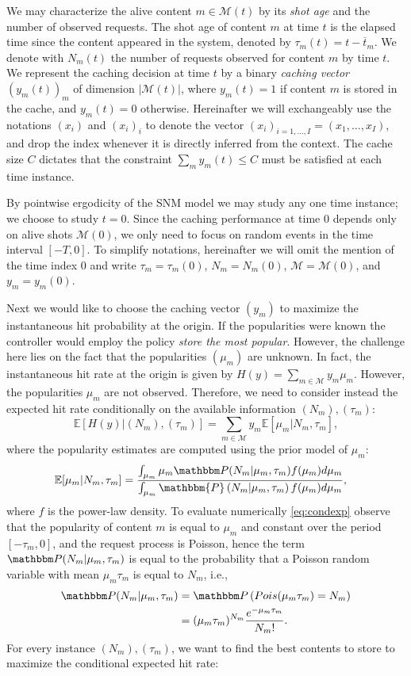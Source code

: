 \documentclass[10pt, conference, letterpaper]{IEEEtran}
\newcommand{\mean}[1]{\mathbb{E}\!\left[#1\right]}
\def\Mcal{\mathcal{M}}
\begin{document}
We may characterize the alive content $m\in\mathcal{M}(t)$ by its \emph{shot age} and the number of observed requests.
The shot age of content $m$ at time $t$ is the elapsed time since the content appeared in the system, denoted by $\tau_m(t)=t-\overline t_m$. 
	We denote with $N_m(t)$ the number of requests observed for content $m$ by time $t$.
We represent the caching decision at time $t$ by a binary \emph{caching vector} $(y_m(t))_m$ of dimension $|\mathcal{M}(t)|$, where $y_m(t)=1$ if content $m$ is stored in the cache, and $y_m(t)=0$ otherwise. 
		Hereinafter we will exchangeably use the notations $(x_i)$ and $(x_i)_i$ to denote the vector $(x_i)_{i=1,\dots,I}=(x_1,\dots,x_I)$, and 
	drop the index whenever it is directly inferred from the context.
		The cache size $C$ dictates that the constraint $\sum_m y_m(t)\leq C$ must be satisfied at each time instance.
	
By pointwise ergodicity of the SNM model  we may study any one time instance; we choose to study $t=0$.
	Since the caching performance at time $0$ depends only on alive shots $\Mcal (0)$, we only need to focus on random events in the time interval $[-T,0]$.
	To simplify notations, hereinafter we will omit the mention of the time index $0$ and write $\tau_m=\tau_m(0)$, $N_m=N_m(0)$, $\mathcal M=\mathcal M(0)$, and $y_m=y_m(0)$.



Next we would like to choose the caching vector $(y_m)$ to maximize the instantaneous hit probability at the origin. 
If the popularities were known the controller would employ the policy \emph{store the most popular}. However, the challenge here lies on the fact that the popularities $(\mu_m)$ are unknown. 
In fact, the instantaneous hit rate at the origin is given by $H(y)=\sum_{m\in\mathcal{M}}y_m\mu_m$. However, the popularities $\mu_m$ are not observed. Therefore, we need to consider instead the expected hit rate conditionally on the available information $(N_m),(\tau_m)$:
\[
\mean{H(y)\big|(N_m),(\tau_m)}=\sum_{m\in\mathcal{M}}y_m\mean{\mu_m|N_m,\tau_m},
\]
where the popularity estimates are computed using the prior model of $\mu_m$:
\begin{align}\label{eq:condexp}
\mean{\mu_m|N_m,\tau_m}&=\frac{\int_{\mu_m} \mu_m\mathbbm P(N_m|\mu_m,\tau_m)f(\mu_m)d\mu_m}{\int_{\mu_m} \mathbbm{P}\left(N_m|\mu_m,\tau_m\right)f(\mu_m)d{\mu_m}},
\end{align}
where $f$ is the power-law density. To evaluate numerically \eqref{eq:condexp} observe that the popularity of content $m$ is equal to $\mu_m$ and constant  over the period $[-\tau_m,0]$, and the request process is Poisson, hence the term $\mathbbm P(N_m|\mu_m,\tau_m)$ is equal to the probability that a Poisson random variable with mean $\mu_m\tau_m$ is equal to $N_m$, i.e.,
\begin{align*}
\mathbbm P(N_m|\mu_m,\tau_m)&=\mathbbm P\left(Pois(\mu_m\tau_m)=N_m\right)\\
&=(\mu_m\tau_m)^{N_m}\frac{e^{-\mu_m\tau_m}}{N_m!}.
\end{align*}
For every instance $(N_m),(\tau_m)$, we want to find the best contents to store to maximize the conditional expected hit rate:
\end{document}
